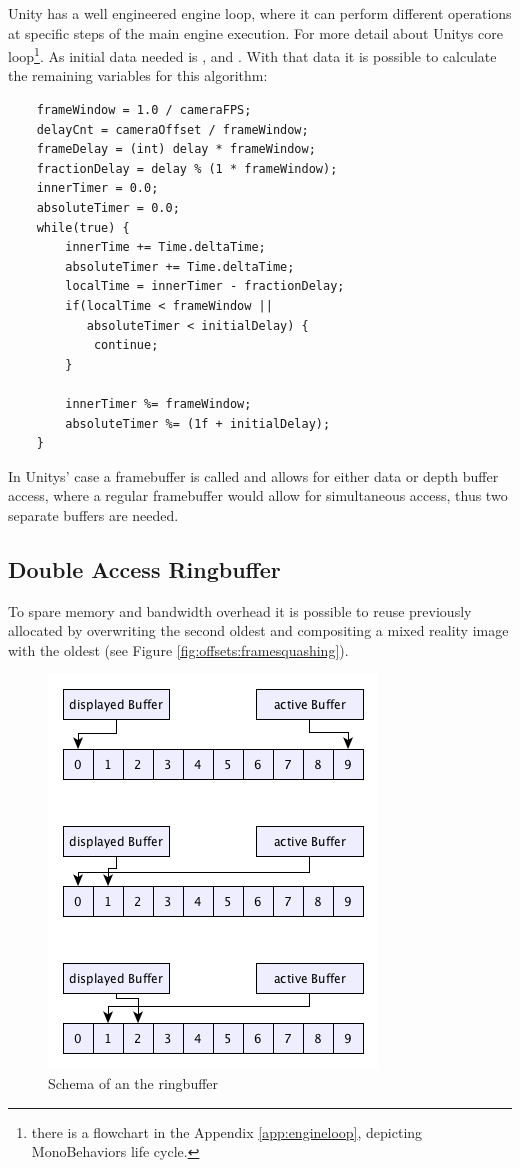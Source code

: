 Unity has a well engineered engine loop, where it can perform different 
operations at specific steps of the main engine execution. For more detail 
about Unitys core loop\footnote{there is a flowchart in the Appendix 
\ref{app:engineloop}, depicting MonoBehaviors life cycle.}. As 
initial data needed is ,  and 
. With that data it is possible to calculate the remaining 
variables for this algorithm:

\begin{lstlisting}
	frameWindow = 1.0 / cameraFPS;
	delayCnt = cameraOffset / frameWindow;
	frameDelay = (int) delay * frameWindow;
	fractionDelay = delay % (1 * frameWindow);
	innerTimer = 0.0;
	absoluteTimer = 0.0;
	while(true) {
		innerTime += Time.deltaTime;
		absoluteTimer += Time.deltaTime;
		localTime = innerTimer - fractionDelay;
		if(localTime < frameWindow ||
		   absoluteTimer < initialDelay) {
			continue;
		}
		
		innerTimer %= frameWindow;
		absoluteTimer %= (1f + initialDelay);
	}
\end{lstlisting}


In Unitys' case a framebuffer is called  and allows 
for either data or depth buffer access, where a regular framebuffer would allow 
for simultaneous access, thus two separate buffers are needed.

\subsection{Double Access Ringbuffer}

To spare memory and bandwidth overhead it is possible to reuse previously 
allocated  by overwriting the second oldest 
 and compositing a mixed reality image with the oldest 
(see  Figure \ref{fig:offsets:framesquashing}).

\begin{figure}[htb]
	\centering
	\includegraphics[width=.5\textwidth]{gfx/ringbuffer_schematics.png}
	\caption{Schema of an the ringbuffer}
	\label{fig:offsets:ringbuffer}
\end{figure}

